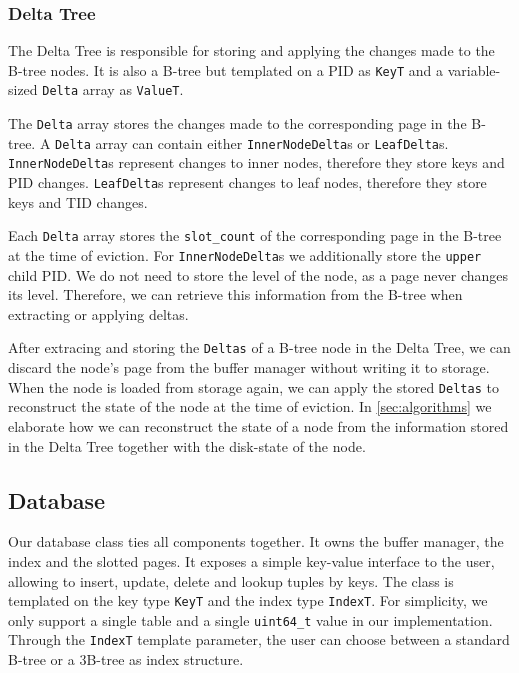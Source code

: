 \subsubsection*{Delta Tree}
The Delta Tree is responsible for storing and applying the changes made to the B-tree nodes.
It is also a B-tree but templated on a \ac{PID} as \texttt{KeyT} and a variable-sized \texttt{Delta} array as \texttt{ValueT}.

The \texttt{Delta} array stores the changes made to the corresponding page in the B-tree.
A \texttt{Delta} array can contain either \texttt{InnerNodeDelta}s or \texttt{LeafDelta}s.
\texttt{InnerNodeDelta}s represent changes to inner nodes, therefore they store keys and \ac{PID} changes.
\texttt{LeafDelta}s represent changes to leaf nodes, therefore they store keys and \ac{TID} changes.

Each \texttt{Delta} array stores the \texttt{slot\_count} of the corresponding page in the B-tree at the time of eviction.
For \texttt{InnerNodeDelta}s we additionally store the \texttt{upper} child \ac{PID}.
We do not need to store the level of the node, as a page never changes its level. 
Therefore, we can retrieve this information from the B-tree when extracting or applying deltas.

After extracing and storing the \texttt{Deltas} of a B-tree node in the Delta Tree, we can discard the node's page from the buffer manager without writing it to storage.
When the node is loaded from storage again, we can apply the stored \texttt{Deltas} to reconstruct the state of the node at the time of eviction.
In \autoref{sec:algorithms} we elaborate how we can reconstruct the state of a node from the information stored in the Delta Tree together with the disk-state of the node.

\subsection*{Database}
Our database class ties all components together.
It owns the buffer manager, the index and the slotted pages.
It exposes a simple key-value interface to the user, allowing to insert, update, delete and lookup tuples by keys.
The class is templated on the key type \texttt{KeyT} and the index type \texttt{IndexT}.
For simplicity, we only support a single table and a single \texttt{uint64\_t} value in our implementation.
Through the \texttt{IndexT} template parameter, the user can choose between a standard B-tree or a 3B-tree as index structure.

